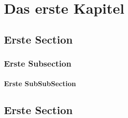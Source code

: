 \documentclass[draft,colorheadings,orange]{tubsbook}
\begin{document}

\chapter{Das erste Kapitel}
\lipsum[1]
\section{Erste Section}
\lipsum[2]
\subsection{Erste Subsection}
\lipsum[3]
\subsubsection{Erste SubSubSection}
\lipsum[4]
\section{Erste Section}
\lipsum[1-6]
\end{document}
